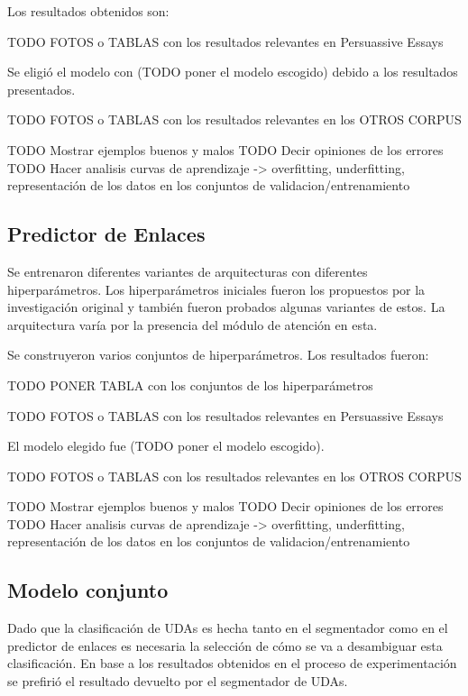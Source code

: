 Los resultados obtenidos son:

TODO FOTOS o TABLAS con los resultados relevantes en Persuassive Essays

Se eligió el modelo con (TODO poner el modelo escogido) debido a los resultados presentados.

TODO FOTOS o TABLAS con los resultados relevantes en los OTROS CORPUS

TODO Mostrar ejemplos buenos y malos
TODO Decir opiniones de los errores
TODO Hacer analisis curvas de aprendizaje -> overfitting, underfitting, representación de los datos en los conjuntos de validacion/entrenamiento

\subsection{Predictor de Enlaces}

Se entrenaron diferentes variantes de arquitecturas con diferentes hiperparámetros. Los hiperparámetros
iniciales fueron los propuestos por la investigación original y también fueron probados algunas variantes 
de estos. La arquitectura varía por la presencia del módulo de atención en esta.

Se construyeron varios conjuntos de hiperparámetros. Los resultados fueron:

TODO PONER TABLA con los conjuntos de los hiperparámetros

TODO FOTOS o TABLAS con los resultados relevantes en Persuassive Essays 

El modelo elegido fue (TODO poner el modelo escogido).

TODO FOTOS o TABLAS con los resultados relevantes en los OTROS CORPUS

TODO Mostrar ejemplos buenos y malos
TODO Decir opiniones de los errores
TODO Hacer analisis curvas de aprendizaje -> overfitting, underfitting, representación de los datos en los conjuntos de validacion/entrenamiento

\subsection{Modelo conjunto}

Dado que la clasificación de UDAs es hecha tanto en el segmentador como en el predictor de enlaces es necesaria 
la selección de cómo se va a desambiguar esta clasificación. En base a los resultados obtenidos en el proceso
de experimentación se prefirió el resultado devuelto por el segmentador de UDAs.


